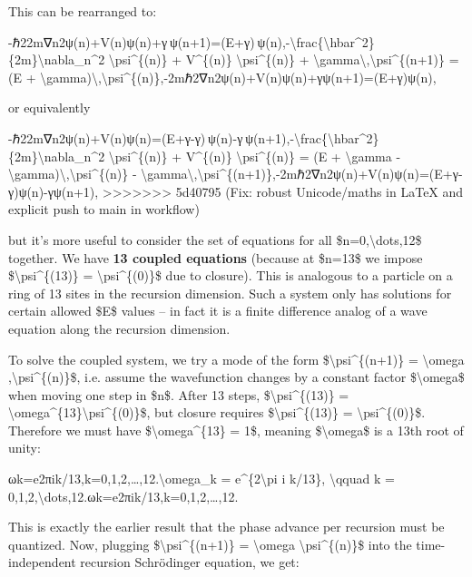 \documentclass[]{article}
\begin{document}
This can be rearranged to:

-ℏ22m∇n2ψ(n)+V(n)ψ(n)+γ ψ(n+1)=(E+γ) ψ(n),-\textbackslash{}frac\{\textbackslash{}hbar\^{}2\}\{2m\}\textbackslash{}nabla\_n\^{}2
\textbackslash{}psi\^{}\{(n)\} + V\^{}\{(n)\}
\textbackslash{}psi\^{}\{(n)\} +
\textbackslash{}gamma\textbackslash{},\textbackslash{}psi\^{}\{(n+1)\} =
(E +
\textbackslash{}gamma)\textbackslash{},\textbackslash{}psi\^{}\{(n)\},-2mℏ2​∇n2​ψ(n)+V(n)ψ(n)+γψ(n+1)=(E+γ)ψ(n),

or equivalently

-ℏ22m∇n2ψ(n)+V(n)ψ(n)=(E+γ-γ) ψ(n)-γ ψ(n+1),-\textbackslash{}frac\{\textbackslash{}hbar\^{}2\}\{2m\}\textbackslash{}nabla\_n\^{}2
\textbackslash{}psi\^{}\{(n)\} + V\^{}\{(n)\}
\textbackslash{}psi\^{}\{(n)\} = (E + \textbackslash{}gamma -
\textbackslash{}gamma)\textbackslash{},\textbackslash{}psi\^{}\{(n)\} -
\textbackslash{}gamma\textbackslash{},\textbackslash{}psi\^{}\{(n+1)\},-2mℏ2​∇n2​ψ(n)+V(n)ψ(n)=(E+γ-γ)ψ(n)-γψ(n+1),
>>>>>>> 5d40795 (Fix: robust Unicode/maths in LaTeX and explicit push to main in workflow)

but it's more useful to consider the set of equations for all
\$n=0,\textbackslash{}dots,12\$ together. We have \textbf{13 coupled
equations} (because at \$n=13\$ we impose
\$\textbackslash{}psi\^{}\{(13)\} = \textbackslash{}psi\^{}\{(0)\}\$ due
to closure)​. This is analogous to a particle on a ring of 13 sites in
the recursion dimension. Such a system only has solutions for certain
allowed \$E\$ values -- in fact it is a finite difference analog of a
wave equation along the recursion dimension.

To solve the coupled system, we try a mode of the form
\$\textbackslash{}psi\^{}\{(n+1)\} = \textbackslash{}omega
,\textbackslash{}psi\^{}\{(n)\}\$, i.e. assume the wavefunction changes
by a constant factor \$\textbackslash{}omega\$ when moving one step in
\$n\$​. After 13 steps, \$\textbackslash{}psi\^{}\{(13)\} =
\textbackslash{}omega\^{}\{13\}\textbackslash{}psi\^{}\{(0)\}\$, but
closure requires \$\textbackslash{}psi\^{}\{(13)\} =
\textbackslash{}psi\^{}\{(0)\}\$. Therefore we must have
\$\textbackslash{}omega\^{}\{13\} = 1\$, meaning
\$\textbackslash{}omega\$ is a 13th root of unity:

ωk=e2πik/13,k=0,1,2,\ldots{},12.\textbackslash{}omega\_k =
e\^{}\{2\textbackslash{}pi i k/13\}, \textbackslash{}qquad k =
0,1,2,\textbackslash{}dots,12.ωk​=e2πik/13,k=0,1,2,\ldots{},12.​

This is exactly the earlier result that the phase advance per recursion
must be quantized. Now, plugging \$\textbackslash{}psi\^{}\{(n+1)\} =
\textbackslash{}omega \textbackslash{}psi\^{}\{(n)\}\$ into the
time-independent recursion Schrödinger equation, we get:
\end{document}
